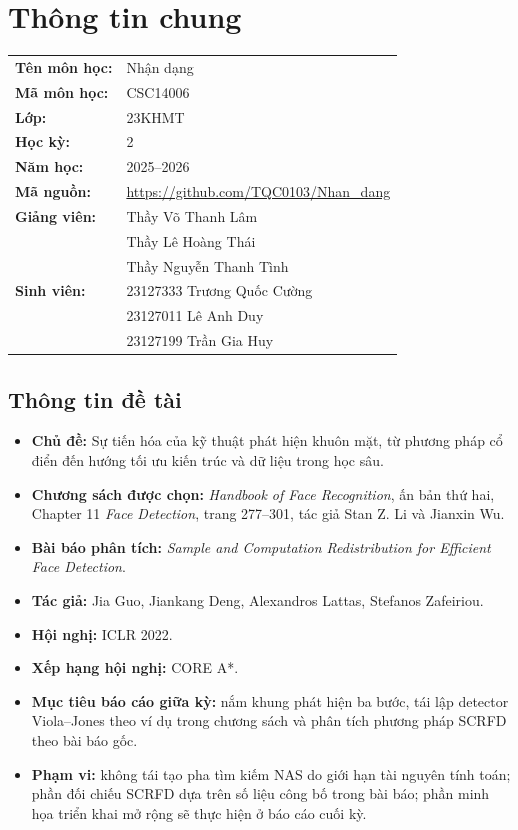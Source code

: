 \chapter*{Thông tin chung}

\noindent
\begin{tabular}{@{}l l@{}}
  \textbf{Tên môn học:} & Nhận dạng \\
  \textbf{Mã môn học:} & CSC14006 \\
  \textbf{Lớp:} & 23KHMT \\
  \textbf{Học kỳ:} & 2 \\
  \textbf{Năm học:} & 2025--2026 \\
  \textbf{Mã nguồn:} & \url{https://github.com/TQC0103/Nhan_dang} \\[4pt]
  \textbf{Giảng viên:} & Thầy Võ Thanh Lâm \\
  & Thầy Lê Hoàng Thái \\
  & Thầy Nguyễn Thanh Tình \\[6pt]
  \textbf{Sinh viên:} & 23127333 Trương Quốc Cường \\
  & 23127011 Lê Anh Duy \\
  & 23127199 Trần Gia Huy \\
\end{tabular}

\section*{Thông tin đề tài}
{}

\begin{itemize}
  \item \textbf{Chủ đề:} Sự tiến hóa của kỹ thuật phát hiện khuôn mặt, từ phương pháp cổ điển đến hướng tối ưu kiến trúc và dữ liệu trong học sâu.
  \item \textbf{Chương sách được chọn:} \textit{Handbook of Face Recognition}, ấn bản thứ hai, Chapter 11 \textit{Face Detection}, trang 277--301, tác giả Stan Z. Li và Jianxin Wu.
  \item \textbf{Bài báo phân tích:} \textit{Sample and Computation Redistribution for Efficient Face Detection}.
  \item \textbf{Tác giả:} Jia Guo, Jiankang Deng, Alexandros Lattas, Stefanos Zafeiriou.
  \item \textbf{Hội nghị:} ICLR 2022.
  \item \textbf{Xếp hạng hội nghị:} CORE A*.
  \item \textbf{Mục tiêu báo cáo giữa kỳ:} nắm khung phát hiện ba bước, tái lập detector Viola--Jones theo ví dụ trong chương sách và phân tích phương pháp SCRFD theo bài báo gốc.
  \item \textbf{Phạm vi:} không tái tạo pha tìm kiếm NAS do giới hạn tài nguyên tính toán; phần đối chiếu SCRFD dựa trên số liệu công bố trong bài báo; phần minh họa triển khai mở rộng sẽ thực hiện ở báo cáo cuối kỳ.
\end{itemize}
\clearpage
